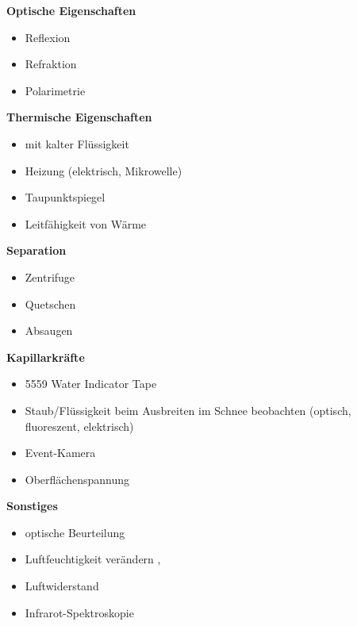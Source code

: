 \textbf{Optische Eigenschaften}
\begin{itemize}
\item Reflexion
\item Refraktion
\item Polarimetrie
\end{itemize}

\textbf{Thermische Eigenschaften}
\begin{itemize}
\item mit kalter Flüssigkeit
\item Heizung (elektrisch, Mikrowelle)
\item Taupunktspiegel
\item Leitfähigkeit von Wärme
\end{itemize}

\textbf{Separation}
\begin{itemize}
\item Zentrifuge
\item Quetschen
\item Absaugen
\end{itemize}

\textbf{Kapillarkräfte}
\begin{itemize}
\item 5559 Water Indicator Tape
\item Staub/Flüssigkeit beim Ausbreiten im Schnee beobachten (optisch, fluoreszent, elektrisch) \cite{kennedylabs-download}
\item Event-Kamera
\item Oberflächenspannung \cite{AlamShibly.2017}
\end{itemize}

\textbf{Sonstiges}
\begin{itemize}
\item optische Beurteilung \cite{miro}
\item Luftfeuchtigkeit verändern \cite{joule-thomson-wiki}, \cite{sensirion-sht4xa-sensors}
\item Luftwiderstand
\item Infrarot-Spektroskopie
\end{itemize}
